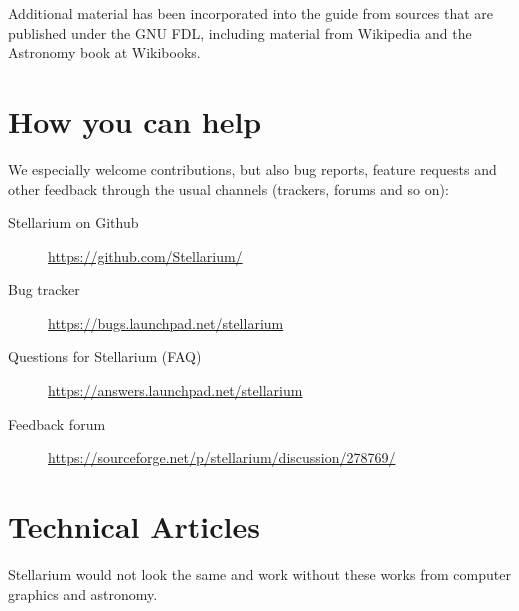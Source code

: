 Additional material has been incorporated into the guide from sources
that are published under the GNU FDL, including material from Wikipedia
and the Astronomy book at Wikibooks.

\section{How you can help}
\label{sec:HowYouCanHelp}

We especially welcome contributions, but also bug reports, feature requests and other feedback through the
usual channels (trackers, forums and so on):
\begin{description}
\item[Stellarium on Github] \url{https://github.com/Stellarium/}
\item[Bug tracker] \url{https://bugs.launchpad.net/stellarium}
\item[Questions for Stellarium (FAQ)] \url{https://answers.launchpad.net/stellarium}
\item[Feedback forum] \url{https://sourceforge.net/p/stellarium/discussion/278769/}
\end{description}


\section{Technical Articles}
\label{sec:ack:technical}

Stellarium would not look the same and work without these works from computer graphics and astronomy.


